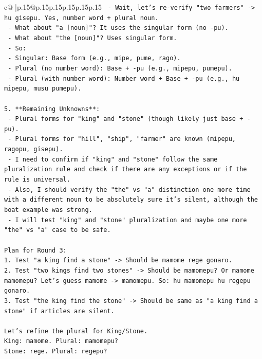 \documentclass{article}
\begin{document}
{\begin{supertabular}{c@{$\;$}|p{.15\linewidth}@{}p{.15\linewidth}p{.15\linewidth}p{.15\linewidth}p{.15\linewidth}p{.15\linewidth}}
{{{\texttt{   {-} Wait, let's re{-}verify "two farmers" {-}> hu gisepu. Yes, number word + plural noun.} \\
\texttt{   {-} What about "a {[}noun{]}"? It uses the singular form (no {-}pu).} \\
\texttt{   {-} What about "the {[}noun{]}"? Uses singular form.} \\
\texttt{   {-} So:} \\
\texttt{     {-} Singular: Base form (e.g., mipe, pume, rago).} \\
\texttt{     {-} Plural (no number word): Base + {-}pu (e.g., mipepu, pumepu).} \\
\texttt{     {-} Plural (with number word): Number word + Base + {-}pu (e.g., hu mipepu, musu pumepu).} \\
\\ 
\texttt{5. **Remaining Unknowns**:} \\
\texttt{   {-} Plural forms for "king" and "stone" (though likely just base + {-}pu).} \\
\texttt{   {-} Plural forms for "hill", "ship", "farmer" are known (mipepu, ragopu, gisepu).} \\
\texttt{   {-} I need to confirm if "king" and "stone" follow the same pluralization rule and check if there are any exceptions or if the rule is universal.} \\
\texttt{   {-} Also, I should verify the "the" vs "a" distinction one more time with a different noun to be absolutely sure it's silent, although the boat example was strong.} \\
\texttt{   {-} I will test "king" and "stone" pluralization and maybe one more "the" vs "a" case to be safe.} \\
\\ 
\texttt{Plan for Round 3:} \\
\texttt{1. Test "a king find a stone" {-}> Should be mamome rege gonaro.} \\
\texttt{2. Test "two kings find two stones" {-}> Should be mamomepu? Or mamome mamomepu? Let's guess mamome {-}> mamomepu. So: hu mamomepu hu regepu gonaro.} \\
\texttt{3. Test "the king find the stone" {-}> Should be same as "a king find a stone" if articles are silent.} \\
\\ 
\texttt{Let's refine the plural for King/Stone.} \\
\texttt{King: mamome. Plural: mamomepu?} \\
\texttt{Stone: rege. Plural: regepu?} \\
}}}
\end{supertabular}}
\end{document}
